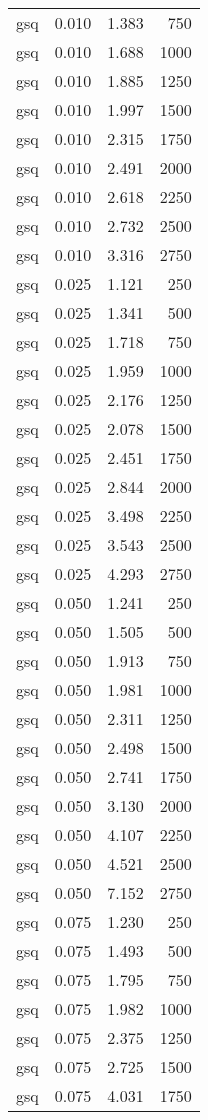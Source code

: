 \begin{table}
\begin{tabular}{lrrr}
gsq & 0.010 & 1.383 & 750 \\
gsq & 0.010 & 1.688 & 1000 \\
gsq & 0.010 & 1.885 & 1250 \\
gsq & 0.010 & 1.997 & 1500 \\
gsq & 0.010 & 2.315 & 1750 \\
gsq & 0.010 & 2.491 & 2000 \\
gsq & 0.010 & 2.618 & 2250 \\
gsq & 0.010 & 2.732 & 2500 \\
gsq & 0.010 & 3.316 & 2750 \\
gsq & 0.025 & 1.121 & 250 \\
gsq & 0.025 & 1.341 & 500 \\
gsq & 0.025 & 1.718 & 750 \\
gsq & 0.025 & 1.959 & 1000 \\
gsq & 0.025 & 2.176 & 1250 \\
gsq & 0.025 & 2.078 & 1500 \\
gsq & 0.025 & 2.451 & 1750 \\
gsq & 0.025 & 2.844 & 2000 \\
gsq & 0.025 & 3.498 & 2250 \\
gsq & 0.025 & 3.543 & 2500 \\
gsq & 0.025 & 4.293 & 2750 \\
gsq & 0.050 & 1.241 & 250 \\
gsq & 0.050 & 1.505 & 500 \\
gsq & 0.050 & 1.913 & 750 \\
gsq & 0.050 & 1.981 & 1000 \\
gsq & 0.050 & 2.311 & 1250 \\
gsq & 0.050 & 2.498 & 1500 \\
gsq & 0.050 & 2.741 & 1750 \\
gsq & 0.050 & 3.130 & 2000 \\
gsq & 0.050 & 4.107 & 2250 \\
gsq & 0.050 & 4.521 & 2500 \\
gsq & 0.050 & 7.152 & 2750 \\
gsq & 0.075 & 1.230 & 250 \\
gsq & 0.075 & 1.493 & 500 \\
gsq & 0.075 & 1.795 & 750 \\
gsq & 0.075 & 1.982 & 1000 \\
gsq & 0.075 & 2.375 & 1250 \\
gsq & 0.075 & 2.725 & 1500 \\
gsq & 0.075 & 4.031 & 1750 \\

\end{tabular}
\end{table}

